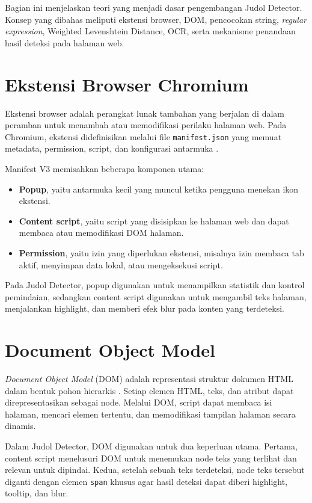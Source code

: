 Bagian ini menjelaskan teori yang menjadi dasar pengembangan Judol Detector.
Konsep yang dibahas meliputi ekstensi browser, DOM, pencocokan string,
\textit{regular expression}, Weighted Levenshtein Distance, OCR, serta
mekanisme penandaan hasil deteksi pada halaman web.

\section{Ekstensi Browser Chromium}

Ekstensi browser adalah perangkat lunak tambahan yang berjalan di dalam
peramban untuk menambah atau memodifikasi perilaku halaman web. Pada Chromium,
ekstensi didefinisikan melalui file \texttt{manifest.json} yang memuat
metadata, permission, script, dan konfigurasi antarmuka \cite{chrome_extensions}.

Manifest V3 memisahkan beberapa komponen utama:

\begin{itemize}
    \item \textbf{Popup}, yaitu antarmuka kecil yang muncul ketika pengguna
    menekan ikon ekstensi.
    \item \textbf{Content script}, yaitu script yang disisipkan ke halaman web
    dan dapat membaca atau memodifikasi DOM halaman.
    \item \textbf{Permission}, yaitu izin yang diperlukan ekstensi, misalnya
    izin membaca tab aktif, menyimpan data lokal, atau mengeksekusi script.
\end{itemize}

Pada Judol Detector, popup digunakan untuk menampilkan statistik dan kontrol
pemindaian, sedangkan content script digunakan untuk mengambil teks halaman,
menjalankan highlight, dan memberi efek blur pada konten yang terdeteksi.

\section{Document Object Model}

\textit{Document Object Model} (DOM) adalah representasi struktur dokumen HTML
dalam bentuk pohon hierarkis \cite{mdn_dom}. Setiap elemen HTML, teks, dan
atribut dapat direpresentasikan sebagai node. Melalui DOM, script dapat membaca
isi halaman, mencari elemen tertentu, dan memodifikasi tampilan halaman secara
dinamis.

Dalam Judol Detector, DOM digunakan untuk dua keperluan utama. Pertama, content
script menelusuri DOM untuk menemukan node teks yang terlihat dan relevan untuk
dipindai. Kedua, setelah sebuah teks terdeteksi, node teks tersebut diganti
dengan elemen \texttt{span} khusus agar hasil deteksi dapat diberi highlight,
tooltip, dan blur.

